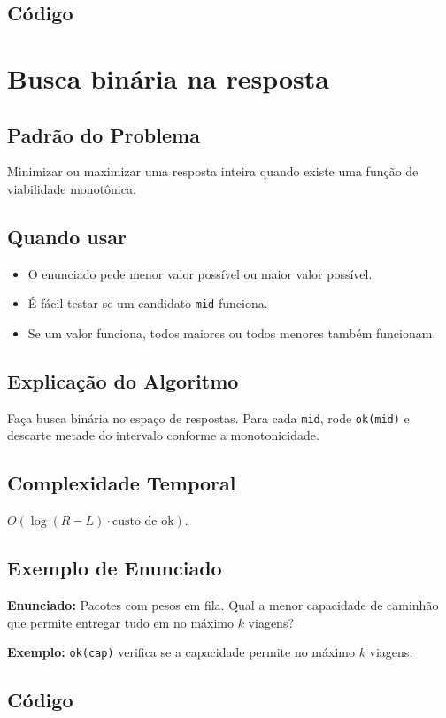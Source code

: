 \subsection{Código}

\section{Busca binária na resposta}

\subsection{Padrão do Problema}
Minimizar ou maximizar uma resposta inteira quando existe uma função de viabilidade monotônica.

\subsection{Quando usar}
\begin{itemize}[nosep]
  \item O enunciado pede menor valor possível ou maior valor possível.
  \item É fácil testar se um candidato \texttt{mid} funciona.
  \item Se um valor funciona, todos maiores ou todos menores também funcionam.
\end{itemize}

\subsection{Explicação do Algoritmo}
Faça busca binária no espaço de respostas. Para cada \texttt{mid}, rode \texttt{ok(mid)} e descarte metade do intervalo conforme a monotonicidade.

\subsection{Complexidade Temporal}
$O(\log(R-L) \cdot \text{custo de ok})$.

\subsection{Exemplo de Enunciado}
\begin{exemplodiabox}
\textbf{Enunciado:} Pacotes com pesos em fila. Qual a menor capacidade de caminhão que permite entregar tudo em no máximo $k$ viagens?

\textbf{Exemplo:} \texttt{ok(cap)} verifica se a capacidade permite no máximo $k$ viagens.
\end{exemplodiabox}

\subsection{Código}
